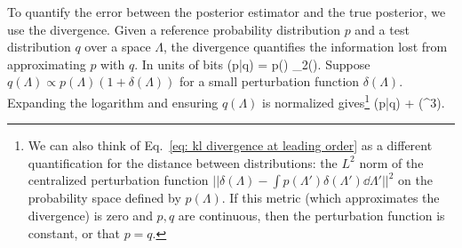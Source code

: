 \documentclass[%
 reprint,
 amsmath,amssymb,
 aps,nofootinbib,nobibnotes,onecolumn,prd
]{revtex4-2}
\begin{document}
To quantify the error between the posterior estimator and the true posterior, we use the \KL divergence. Given a reference probability distribution $p$ and a test distribution $q$ over a space $\Lambda$, the \KL divergence quantifies the information lost from approximating $p$ with $q$. In units of bits \citep{MacKay2003}
\beq
\KLD(p|q) = \int p(\Lambda) \log_2\left(\right)\dd\Lambda.
\label{eq: kl divergence}
\eeq
Suppose $q(\Lambda) \propto p(\Lambda)(1+\delta(\Lambda))$ for a small perturbation function $\delta(\Lambda)$. Expanding the logarithm and ensuring $q(\Lambda)$ is normalized gives\footnote{We can also think of Eq.~\ref{eq: kl divergence at leading order} as a different quantification for the distance between distributions: the $L^2$ norm of the centralized perturbation function $||\delta(\Lambda) - \int p(\Lambda')\delta(\Lambda')\dd\Lambda'||^2$ on the probability space defined by $p(\Lambda)$. If this metric (which approximates the \KL divergence) is zero and $p, q$ are continuous, then the perturbation function is constant, or that $p=q$.}
\beq
\KLD(p|q) \approx {}  + (\delta^3).
\label{eq: kl divergence at leading order}
\eeq
\end{document}
